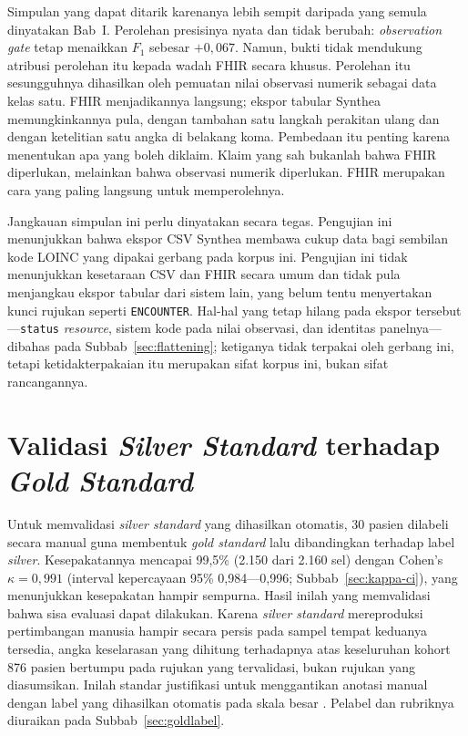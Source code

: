 Simpulan yang dapat ditarik karenanya lebih sempit daripada yang semula dinyatakan Bab~I.
Perolehan presisinya nyata dan tidak berubah: \emph{observation gate} tetap menaikkan $F_1$
sebesar $+0{,}067$. Namun, bukti tidak mendukung atribusi perolehan itu kepada wadah FHIR secara khusus. Perolehan itu sesungguhnya dihasilkan oleh pemuatan nilai observasi numerik sebagai data kelas satu. FHIR menjadikannya langsung; ekspor tabular Synthea memungkinkannya pula,
dengan tambahan satu langkah perakitan ulang dan dengan ketelitian satu angka di belakang koma.
Pembedaan itu penting karena menentukan apa yang boleh diklaim. Klaim yang sah bukanlah
bahwa FHIR diperlukan, melainkan bahwa observasi numerik diperlukan. FHIR merupakan cara
yang paling langsung untuk memperolehnya.

Jangkauan simpulan ini perlu dinyatakan secara tegas. Pengujian ini menunjukkan bahwa ekspor CSV Synthea membawa cukup data bagi sembilan kode LOINC yang dipakai gerbang pada
korpus ini. Pengujian ini tidak menunjukkan kesetaraan CSV dan FHIR secara umum dan tidak pula
menjangkau ekspor tabular dari sistem lain, yang belum tentu menyertakan kunci rujukan seperti
\texttt{ENCOUNTER}. Hal-hal yang tetap hilang pada ekspor tersebut---\texttt{status}
\emph{resource}, sistem kode pada nilai observasi, dan identitas panelnya---dibahas pada
Subbab~\ref{sec:flattening}; ketiganya tidak terpakai oleh gerbang ini, tetapi ketidakterpakaian
itu merupakan sifat korpus ini, bukan sifat rancangannya.

\section{Validasi \emph{Silver Standard} terhadap \emph{Gold Standard}}
\label{sec:gold}

Untuk memvalidasi \emph{silver standard} yang dihasilkan otomatis, 30 pasien
dilabeli secara manual guna membentuk \emph{gold standard} lalu dibandingkan terhadap label
\emph{silver}. Kesepakatannya mencapai 99,5\% (2.150 dari 2.160 sel)
dengan Cohen's $\kappa = 0{,}991$ (interval kepercayaan 95\% 0,984---0,996;
Subbab~\ref{sec:kappa-ci}), yang menunjukkan kesepakatan hampir sempurna.
Hasil inilah yang memvalidasi bahwa sisa evaluasi dapat dilakukan. Karena
\emph{silver standard} mereproduksi pertimbangan manusia hampir secara persis pada sampel
tempat keduanya tersedia, angka keselarasan yang dihitung terhadapnya atas keseluruhan
kohort 876 pasien bertumpu pada rujukan yang tervalidasi, bukan rujukan yang diasumsikan.
Inilah standar justifikasi untuk menggantikan anotasi manual dengan label yang dihasilkan
otomatis pada skala besar \cite{rebholz2011,nogues2022}. Pelabel dan rubriknya diuraikan pada Subbab~\ref{sec:goldlabel}.

